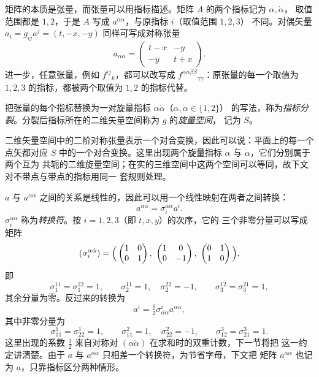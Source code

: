 矩阵的本质是张量，而张量可以用指标描述。矩阵 $A$ 的两个指标记为 $\alpha,\dot\alpha$，
取值范围都是 $1,2$，于是 $A$ 写成 $a^{\alpha\dot\alpha}$，与原指标 $i$（取值范围 $1,2,3$）
不同。对偶矢量 $a_i=g_{ij}a^j=(t,-x,-y)$ 同样可写成对称张量
\[
a_{\alpha\dot\alpha}=\begin{pmatrix} t-x & -y\\ -y & t+x\end{pmatrix}.
\]
进一步，任意张量，例如 ${f^{ij}}_k$，都可以改写成
${f^{\alpha\dot\alpha\beta\dot\beta}}_{\gamma\dot\gamma}$：原张量的每一个取值为 $1,2,3$
的指标，都被两个取值为 $1,2$ 的指标代替。

\begin{definition}[指标分裂与旋量空间]
把张量的每个指标替换为一对旋量指标 $\alpha\dot\alpha$（$\alpha,\dot\alpha\in\{1,2\}$）
的写法，称为\emph{指标分裂}。分裂后指标所在的二维矢量空间称为 $g$ 的\emph{旋量空间}，
记为 $S$。
\end{definition}

二维矢量空间中的二阶对称张量表示一个对合变换，因此可以说：平面上的每一个点矢都对应 $S$
中的一个对合变换。这里出现两个旋量指标 $\alpha$ 与 $\dot\alpha$，它们分别属于两个互为
共轭的二维旋量空间；在实的三维空间中这两个空间可以等同，故下文对不带点与带点的指标用同一
套规则处理。

$a$ 与 $a^{\alpha\dot\alpha}$ 之间的关系是线性的，因此可以用一个线性映射在两者之间转换：
\[
a^{\alpha\dot\alpha}=\sigma^{\alpha\dot\alpha}_i a^i .
\]
$\sigma^{\alpha\dot\alpha}_i$ 称为\emph{转换符}。按 $i=1,2,3$（即 $t,x,y$）的次序，它的
三个非零分量可以写成矩阵
\[
(\sigma^{\alpha\dot\alpha}_i)=
\Bigl(\,
\begin{pmatrix}1&0\\0&1\end{pmatrix},\
\begin{pmatrix}1&0\\0&-1\end{pmatrix},\
\begin{pmatrix}0&1\\1&0\end{pmatrix}
\,\Bigr),
\]
即
\[
\sigma^{11}_1=\sigma^{22}_1=1,\qquad
\sigma^{11}_2=1,\quad \sigma^{22}_2=-1,\qquad
\sigma^{12}_3=\sigma^{21}_3=1,
\]
其余分量为零。反过来的转换为
\[
a^i=\tfrac12\sigma^i_{\alpha\dot\alpha}a^{\alpha\dot\alpha},
\]
其中非零分量为
\[
\sigma^1_{11}=\sigma^1_{22}=1,\qquad
\sigma^2_{11}=1,\quad \sigma^2_{22}=-1,\qquad
\sigma^3_{12}=\sigma^3_{21}=1 .
\]
这里出现的系数 $\frac12$ 来自对称对 $(\alpha\dot\alpha)$ 在求和时的双重计数，下一节将把
这一约定讲清楚。由于 $a$ 与 $a^{\alpha\dot\alpha}$ 只相差一个转换符，为节省字母，下文把
矩阵 $a^{\alpha\dot\alpha}$ 也记为 $a$，只靠指标区分两种情形。

